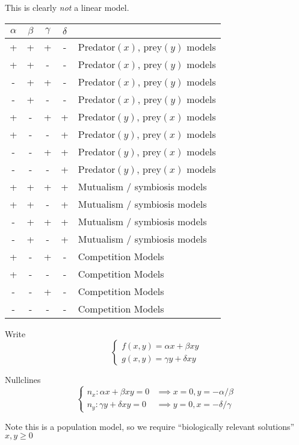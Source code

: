 \documentclass{X:/Documents/Coding/Latex/myassignment}
\begin{document}
This is clearly \textit{not} a linear model.

\begin{table}
\centering
     \begin{tabular}{c|c|c|c|l}  
        $\alpha$ & $\beta$ & $\gamma$ & $\delta$ & \\
        \hline
        +&+&+&-&Predator$(x)$, prey$(y)$ models\\
        +&+&-&-&Predator$(x)$, prey$(y)$ models\\
        -&+&+&-&Predator$(x)$, prey$(y)$ models\\
        -&+&-&-&Predator$(x)$, prey$(y)$ models\\
        \hline
        +&-&+&+&Predator$(y)$, prey$(x)$ models\\
        +&-&-&+&Predator$(y)$, prey$(x)$ models\\
        -&-&+&+&Predator$(y)$, prey$(x)$ models\\
        -&-&-&+&Predator$(y)$, prey$(x)$ models\\
        \hline
        +&+&+&+&Mutualism / symbiosis models\\
        +&+&-&+&Mutualism / symbiosis models\\
        -&+&+&+&Mutualism / symbiosis models\\
        -&+&-&+&Mutualism / symbiosis models\\
        \hline
        +&-&+&-&Competition Models\\
        +&-&-&-&Competition Models\\
        -&-&+&-&Competition Models\\
        -&-&-&-&Competition Models\\
     \end{tabular}
\end{table} 



Write
\[\begin{cases}
    f(x,y) = \alpha x + \beta xy\\
    g(x,y) = \gamma y + \delta xy
\end{cases}\]

Nullclines
\[\begin{cases}
    n_x : \alpha x + \beta xy = 0 &\implies x =0, y = -\alpha/\beta\\
    n_y : \gamma y + \delta xy = 0 &\implies y =0, x = -\delta/\gamma
\end{cases}\]

Note this is a population model, so we require ``biologically relevant solutions'' $x,y \geq 0$
\end{document}
